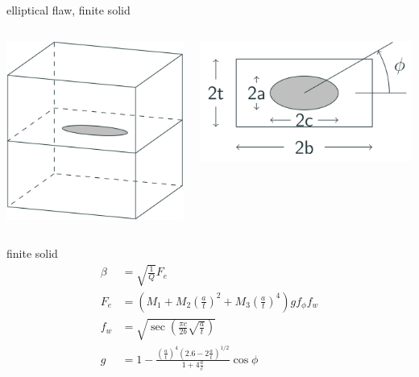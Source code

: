 \documentclass[
  letterpaper,
  ignorenonframetext,
  aspectratio=43,
  handout,
  12pt]{beamer}
\let\Oldincludegraphics\includegraphics
\renewcommand{\includegraphics}[2][]{\Oldincludegraphics[width=\textwidth,height=0.7\textheight,keepaspectratio]{#2}}
\begin{document}
\begin{frame}{elliptical flaw, finite solid}
\protect\hypertarget{elliptical-flaw-finite-solid}{}
\begin{columns}[T]
\begin{column}{0.5\textwidth}
\includegraphics{../images/internal flaw.svg}
\end{column}

\begin{column}{0.5\textwidth}
\includegraphics{../images/internal-flaw-finite.svg}
\end{column}
\end{columns}
\end{frame}

\begin{frame}{finite solid}
\protect\hypertarget{finite-solid}{}
\[\begin{aligned}
  \beta &= \sqrt{\frac{1}{Q}} F_e\\
  F_e &= \left(M_1 + M_2 \left(\frac{a}{t}\right)^2 + M_3 \left(\frac{a}{t}\right)^4\right)g f_\phi f_w\\
  f_w &= \sqrt{\sec\left(\frac{\pi c}{2b}\sqrt{\frac{a}{t}}\right)}\\
  g &= 1 - \frac{\left(\frac{a}{t}\right)^4\left(2.6-2\frac{a}{t}\right)^{1/2}}{1+4\frac{a}{c}}\cos \phi
\end{aligned}\]
\end{frame}
\end{document}

